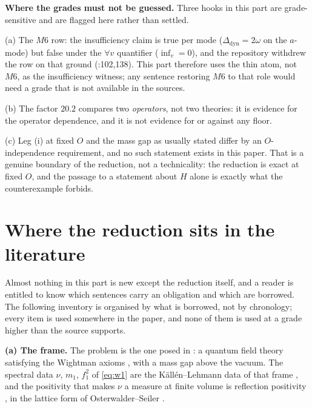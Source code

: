\begin{warnbox}
\textbf{Where the grades must not be guessed.} Three hooks in this part are grade-sensitive and are
flagged here rather than settled.

(a) The $M6$ row: the insufficiency claim is true per mode ($\Delta_{\mathrm{dyn}}=2\omega$ on the
$a$-mode) but false under the $\forall v$ quantifier ($\inf_v=0$), and the repository withdrew the
row on that ground (:102,138). This part therefore uses the thin atom, not $M6$, as
the insufficiency witness; any sentence restoring $M6$ to that role would need a grade that is not
available in the sources.

(b) The factor $20.2$ compares two \emph{operators}, not two theories: it is evidence for the
operator dependence, and it is not evidence for or against any floor.

(c) Leg (i) at fixed $O$ and the mass gap as usually stated differ by an $O$-independence
requirement, and no such statement exists in this paper. That is a genuine boundary of the
reduction, not a technicality: the reduction is exact at fixed $O$, and the passage to a statement
about $H$ alone is exactly what the counterexample forbids.
\end{warnbox}

\section{Where the reduction sits in the literature}
\label{sec:reduction-inherited}

Almost nothing in this part is new except the reduction itself, and a reader is entitled to know which
sentences carry an obligation and which are borrowed. The following inventory is organised by what is
borrowed, not by chronology; every item is used somewhere in the paper, and none of them is used at a
grade higher than the source supports.

\noindent\textbf{(a) The frame.} The problem is the one posed in \cite{jaffe}: a quantum field theory
satisfying the Wightman axioms \cite{sw}, with a mass gap above the vacuum. The spectral data
$\nu$, $m_1$, $f_1^2$ of \eqref{eq:w1} are the K\"all\'en--Lehmann data of that frame \cite{kl}, and
the positivity that makes $\nu$ a measure at finite volume is reflection positivity
\cite{os1973}, in the lattice form of Osterwalder--Seiler \cite{osterwalder-seiler}.

